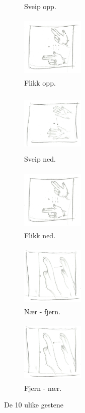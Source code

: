 \begin{figure}[h]
\begin{subfigure}{0.23\textwidth}
\caption{Sveip opp.}
\label{fig:sveip-opp}
\end{subfigure}
\begin{subfigure}{0.23\textwidth}
\includegraphics[width=3cm, height=3cm]{fig/flick-d-u}
\caption{Flikk opp.}
\label{fig:flikk-opp}
\end{subfigure}
\begin{subfigure}{0.23\textwidth}
\includegraphics[width=3cm, height=3cm]{fig/swipe-u-d}
\caption{Sveip ned.}
\label{fig:sveip-ned}
\end{subfigure}
\begin{subfigure}{0.23\textwidth}
\includegraphics[width=3cm, height=3cm]{fig/flick-u-d}
\caption{Flikk ned.}
\label{fig:flikk-ned}
\end{subfigure}
\begin{subfigure}{0.25\textwidth}
\includegraphics[width=3cm, height=3cm]{fig/near-far}
\caption{Nær - fjern.}
\label{fig:n-f}
\end{subfigure}
\begin{subfigure}{0.23\textwidth}
\includegraphics[width=3cm, height=3cm]{fig/far-near}
\caption{Fjern - nær.}
\label{fig:f-n}
\end{subfigure}
\caption{De 10 ulike gestene}
\label{fig:gester}
\end{figure}
